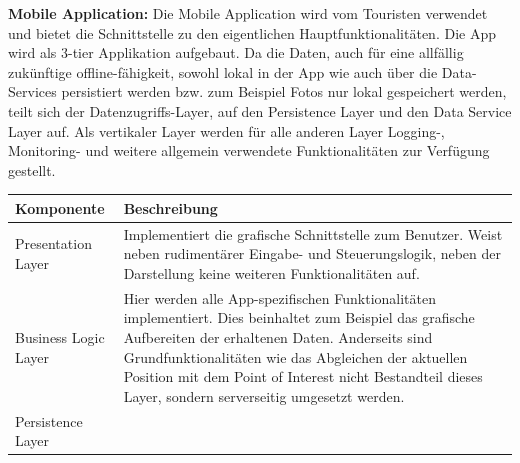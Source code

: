 \documentclass[ngerman,]{article}
\begin{document}
\textbf{Mobile Application:} Die Mobile Application wird vom Touristen
verwendet und bietet die Schnittstelle zu den eigentlichen
Hauptfunktionalitäten. Die App wird als 3-tier Applikation aufgebaut. Da
die Daten, auch für eine allfällig zukünftige offline-fähigkeit, sowohl
lokal in der App wie auch über die Data-Services persistiert werden bzw.
zum Beispiel Fotos nur lokal gespeichert werden, teilt sich der
Datenzugriffs-Layer, auf den Persistence Layer und den Data Service
Layer auf. Als vertikaler Layer werden für alle anderen Layer Logging-,
Monitoring- und weitere allgemein verwendete Funktionalitäten zur
Verfügung gestellt.

\begin{longtable}[]{@{}ll@{}}
\toprule
\begin{minipage}[b]{0.08\columnwidth}\raggedright\strut
\textbf{Komponente}\strut
\end{minipage} & \begin{minipage}[b]{0.86\columnwidth}\raggedright\strut
\textbf{Beschreibung}\strut
\end{minipage}\tabularnewline
\midrule
\endhead
\begin{minipage}[t]{0.08\columnwidth}\raggedright\strut
Presentation Layer\strut
\end{minipage} & \begin{minipage}[t]{0.86\columnwidth}\raggedright\strut
Implementiert die grafische Schnittstelle zum Benutzer. Weist neben
rudimentärer Eingabe- und Steuerungslogik, neben der Darstellung keine
weiteren Funktionalitäten auf.\strut
\end{minipage}\tabularnewline
\begin{minipage}[t]{0.08\columnwidth}\raggedright\strut
Business Logic Layer\strut
\end{minipage} & \begin{minipage}[t]{0.86\columnwidth}\raggedright\strut
Hier werden alle App-spezifischen Funktionalitäten implementiert. Dies
beinhaltet zum Beispiel das grafische Aufbereiten der erhaltenen Daten.
Anderseits sind Grundfunktionalitäten wie das Abgleichen der aktuellen
Position mit dem Point of Interest nicht Bestandteil dieses Layer,
sondern serverseitig umgesetzt werden.\strut
\end{minipage}\tabularnewline
\begin{minipage}[t]{0.08\columnwidth}\raggedright\strut
Persistence Layer\strut
\end{minipage} & \begin{minipage}[t]{0.86\columnwidth}\raggedright\strut

\end{minipage}
\end{longtable}
\end{document}
